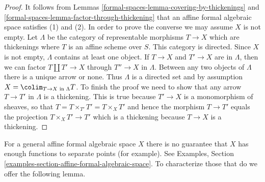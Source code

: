 \begin{proof}
It follows from Lemmas \ref{formal-spaces-lemma-covering-by-thickenings} and
\ref{formal-spaces-lemma-factor-through-thickening} that an affine formal algebraic space
satisfies (1) and (2). In order to prove the converse we may
assume $X$ is not empty.
Let $\Lambda$ be the category of representable morphisms $T \to X$ which are
thickenings where $T$ is an affine scheme over $S$. This category
is directed. Since $X$ is not empty, $\Lambda$ contains at least one
object. If $T \to X$ and $T' \to X$ are in $\Lambda$, then we can
factor $T \amalg T' \to X$ through $T'' \to X$ in $\Lambda$. Between
any two objects of $\Lambda$ there is a unique arrow or none. Thus
$\Lambda$ is a directed set and by assumption
$X = \colim_{T \to X\text{ in }\Lambda} T$. To finish the proof
we need to show that any arrow $T \to T'$ in $\Lambda$ is a thickening.
This is true because $T' \to X$ is a monomorphism of sheaves, so that
$T = T \times_{T'} T' = T \times_X T'$ and hence the morphism
$T \to T'$ equals the projection $T \times_X T' \to T'$ which is
a thickening because $T \to X$ is a thickening.
\end{proof}

For a general affine formal algebraic space $X$ there is no guarantee
that $X$ has enough functions to separate points (for example).
See Examples, Section \ref{examples-section-affine-formal-algebraic-space}.
To characterize those that do we offer the following lemma.

